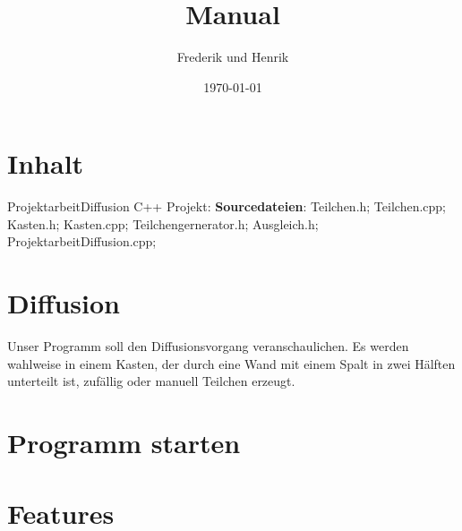 \documentclass[14pt,a4paper]{scrartcl}
\title{Manual}
\author{Frederik und Henrik}
\date{\today}
\begin{document}
 
\maketitle
\tableofcontents
\section{Inhalt}
ProjektarbeitDiffusion C++ Projekt:
\newline
\textbf{Sourcedateien}:
Teilchen.h;
Teilchen.cpp;
Kasten.h;
Kasten.cpp;
Teilchengernerator.h;
Ausgleich.h;
ProjektarbeitDiffusion.cpp;

\section{Diffusion}
Unser Programm soll den Diffusionsvorgang veranschaulichen.
Es werden wahlweise in einem Kasten, der durch eine Wand mit einem Spalt in zwei Hälften unterteilt ist, zufällig oder manuell Teilchen erzeugt.

\section{Programm starten}

\section{Features}

  
\end{document}
